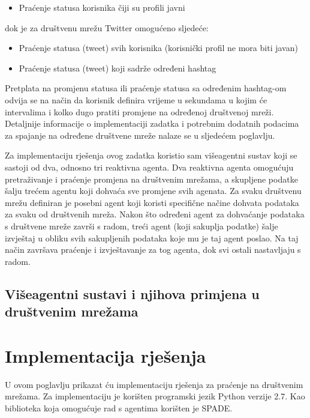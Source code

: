 \documentclass[a4paper,12pt]{foi}
\begin{document}
\begin{itemize}
\item{Praćenje statusa korisnika čiji su profili javni}
\end{itemize}
dok je za društvenu mrežu Twitter omogućeno sljedeće:
\begin{itemize}
\item{Praćenje statusa (tweet) svih korisnika (korisnički profil ne mora biti javan)}
\item{Praćenje statusa (tweet) koji sadrže određeni hashtag}
\end{itemize}

Pretplata na promjenu statusa ili praćenje statusa sa određenim hashtag-om odvija se na način da korisnik definira vrijeme u sekundama u kojim će intervalima i kolko dugo pratiti promjene na određenoj društvenoj mreži. Detaljnije informacije o implementaciji zadatka i potrebnim dodatnih podacima za spajanje na određene društvene mreže nalaze se u sljedećem poglavlju.

Za implementaciju rješenja ovog zadatka koristio sam višeagentni sustav koji se sastoji od dva, odnosno tri reaktivna agenta. Dva reaktivna agenta omogućuju pretraživanje i praćenje promjena na društvenim mrežama, a skupljene podatke šalju trećem agentu koji dohvaća sve promjene svih agenata. Za svaku društvenu mrežu definiran je posebni agent koji koristi specifične načine dohvata podataka za svaku od društvenih mreža. Nakon što određeni agent za dohvaćanje podataka s društvene mreže završi s radom, treći agent (koji sakuplja podatke) šalje izvještaj u obliku svih sakupljenih podataka koje mu je taj agent poslao. Na taj način završava praćenje i izvještavanje za tog agenta, dok svi ostali nastavljaju s radom.

\section{Višeagentni sustavi i njihova primjena u društvenim mrežama}



\citep{ArandaPalanca2012} \citep{JonkerTreur2002} \citep{Lerman2008}



\chapter{Implementacija rješenja}

U ovom poglavlju prikazat ću implementaciju rješenja za praćenje na društvenim mrežama. Za implementaciju je korišten programski jezik Python verzije 2.7. Kao biblioteka koja omogućuje rad s agentima korišten je SPADE.
\end{document}
